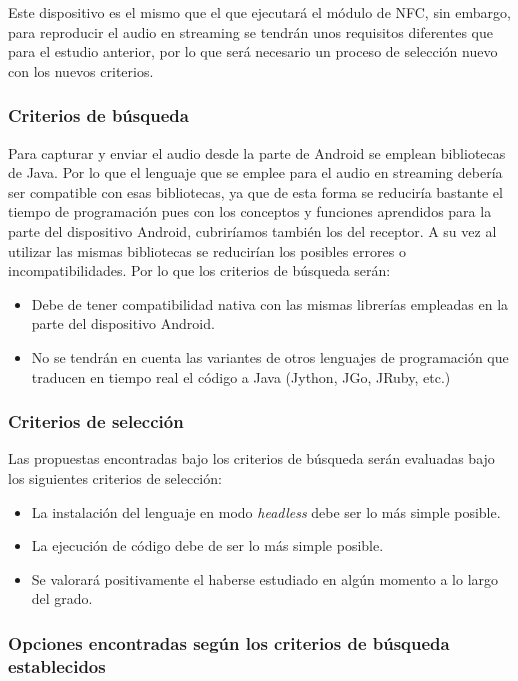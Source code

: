 Este dispositivo es el mismo que el que ejecutará el módulo de NFC, sin embargo,
para reproducir el audio en streaming se tendrán unos requisitos diferentes que
para el estudio anterior, por lo que será necesario un proceso de selección
nuevo con los nuevos criterios.

\subsubsection{Criterios de búsqueda}

Para capturar y enviar el audio desde la parte de Android se emplean bibliotecas
de Java. Por lo que el lenguaje que se emplee para el audio en streaming debería
ser compatible con esas bibliotecas, ya que de esta forma se reduciría bastante
el tiempo de programación pues con los conceptos y funciones aprendidos para la
parte del dispositivo Android, cubriríamos también los del receptor. A su vez al
utilizar las mismas bibliotecas se reducirían los posibles errores o
incompatibilidades. Por lo que los criterios de búsqueda serán:

\begin{itemize}
    \item Debe de tener compatibilidad nativa con las mismas librerías empleadas
    en la parte del dispositivo Android.
    \item No se tendrán en cuenta las variantes de otros lenguajes de
    programación que traducen en tiempo real el código a Java (Jython, JGo,
    JRuby, etc.)
\end{itemize}

\subsubsection{Criterios de selección}

Las propuestas encontradas bajo los criterios de búsqueda serán evaluadas bajo
los siguientes criterios de selección:

\begin{itemize}
    \item La instalación del lenguaje en modo \emph{headless} debe ser lo más simple posible.
    \item La ejecución de código debe de ser lo más simple posible.
    \item Se valorará positivamente el haberse estudiado en algún momento a lo largo del grado.
\end{itemize}

\subsubsection{Opciones encontradas según los criterios de búsqueda establecidos}

